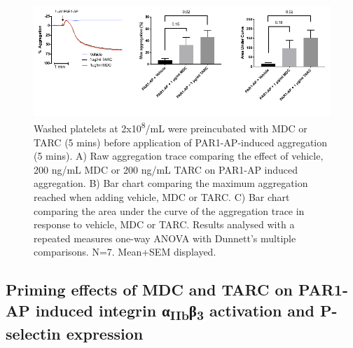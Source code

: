 \documentclass[11pt,twoside]{bristolthesis}
\begin{document}
\begin{figure}
\includegraphics{figure/Chemokines/Layouts/MDC_TARC_aggregation_PAR1} \caption[The priming effect of the chemokines MDC and TARC on PAR1-AP induced platelet aggregation in washed platelets]{Washed platelets at 2x10\textsuperscript{8}/mL were preincubated with MDC or TARC (5 mins) before application of PAR1-AP-induced aggregation (5 mins). A) Raw aggregation trace comparing the effect of vehicle, 200 ng/mL MDC or 200 ng/mL TARC on PAR1-AP induced aggregation. B) Bar chart comparing the maximum aggregation reached when adding vehicle, MDC or TARC. C) Bar chart comparing the area under the curve of the aggregation trace in response to vehicle, MDC or TARC. Results analysed with a repeated measures one-way ANOVA with Dunnett's multiple comparisons. N=7. Mean+SEM displayed.}\label{fig:MDC-TARC-agg}
\end{figure}
\hypertarget{priming-effects-of-mdc-and-tarc-on-par1-ap-induced-integrin-ux3b1iibux3b23-activation-and-p-selectin-expression}{%
\subsection{\texorpdfstring{Priming effects of MDC and TARC on PAR1-AP induced integrin α\textsubscript{IIb}β\textsubscript{3} activation and P-selectin expression}{Priming effects of MDC and TARC on PAR1-AP induced integrin αIIbβ3 activation and P-selectin expression}}\label{priming-effects-of-mdc-and-tarc-on-par1-ap-induced-integrin-ux3b1iibux3b23-activation-and-p-selectin-expression}}
\end{document}
